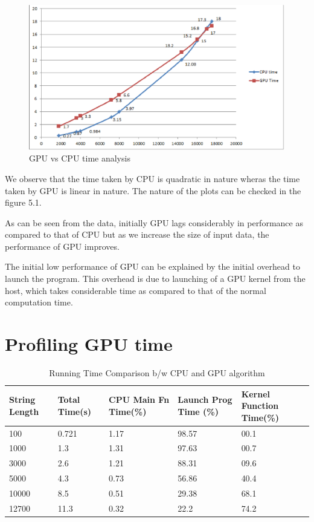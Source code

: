 \documentclass[a4paper,11pt]{report}
\begin{document}
{\begin{figure}[ht]
  \begin{center}
    \includegraphics[width=15cm]{images/gpuvscpu}
    \caption{GPU vs CPU time analysis}
    \label{fig:}
  \end{center}
\end{figure}

We observe that the time taken by CPU is quadratic in nature wheras the time taken by GPU is linear in nature. The nature of the plots can be checked in the figure 5.1.

As can be seen from the data, initially GPU lags considerably in performance as compared to that of CPU but as we increase the size of input data, the performance of GPU improves.

The initial low performance of GPU can be explained by the initial overhead to launch the program. This overhead is due to launching of a GPU kernel from the host, which takes considerable time as compared to that of the normal computation time.

\section{Profiling GPU time}

\begin{table}[ht]
\caption{Running Time Comparison b/w CPU and GPU algorithm} %
\centering 
\begin{tabular} {| p{2cm} | p{2cm} | p{3cm} | p{2cm} | p{3cm}|}
\hline
String Length & Total Time(s) & CPU Main Fn Time(\%) & Launch Prog Time (\%) & Kernel Function Time(\%)  \\ \hline 
100 & 0.721 & 1.17 & 98.57 & 00.1 \\
1000 & 1.3 & 1.31 & 97.63 & 00.7 \\ 
3000 & 2.6 & 1.21 & 88.31 & 09.6 \\
5000 & 4.3 & 0.73 & 56.86 & 40.4 \\
10000 & 8.5 & 0.51 & 29.38 & 68.1 \\
12700 & 11.3 & 0.32 & 22.2 & 74.2 \\
\hline
\end{tabular}
\end{table}

}
\end{document}
